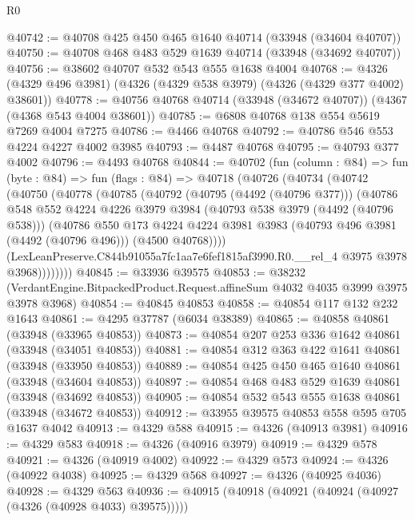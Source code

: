 \begin{lexlean}{R0}
\begin{coremodule}
@40742 := @40708 @425 @450 @465 @1640 @40714 (@33948 (@34604 @40707))
@40750 := @40708 @468 @483 @529 @1639 @40714 (@33948 (@34692 @40707))
@40756 := @38602 @40707 @532 @543 @555 @1638 @4004
@40768 := @4326 (@4329 @496 @3981) (@4326 (@4329 @538 @3979) (@4326 (@4329 @377 @4002) @38601))
@40778 := @40756 @40768 @40714 (@33948 (@34672 @40707)) (@4367 (@4368 @543 @4004 @38601))
@40785 := @6808 @40768 @138 @554 @5619 @7269 @4004 @7275
@40786 := @4466 @40768
@40792 := @40786 @546 @553 @4224 @4227 @4002 @3985
@40793 := @4487 @40768
@40795 := @40793 @377 @4002
@40796 := @4493 @40768
@40844 := @40702
    (fun (column : @84) =>
    fun (byte : @84) =>
    fun (flags : @84) =>
    @40718
      (@40726
        (@40734
          (@40742
            (@40750
              (@40778
                (@40785
                  (@40792
                    (@40795 (@4492 (@40796 @377)))
                    (@40786
                      @548
                      @552
                      @4224
                      @4226
                      @3979
                      @3984
                      (@40793 @538 @3979 (@4492 (@40796 @538)))
                      (@40786
                        @550
                        @173
                        @4224
                        @4224
                        @3981
                        @3983
                        (@40793 @496 @3981 (@4492 (@40796 @496)))
                        (@4500 @40768))))
                  (LexLeanPreserve.C844b91055a7fc1aa7e6fef1815af3990.R0.__rel_4
                    @3975
                    @3978
                    @3968))))))))
@40845 := @33936 @39575
@40853 := @38232
    (VerdantEngine.BitpackedProduct.Request.affineSum @4032 @4035 @3999 @3975 @3978 @3968)
@40854 := @40845 @40853
@40858 := @40854 @117 @132 @232 @1643
@40861 := @4295 @37787 (@6034 @38389)
@40865 := @40858 @40861 (@33948 (@33965 @40853))
@40873 := @40854 @207 @253 @336 @1642 @40861 (@33948 (@34051 @40853))
@40881 := @40854 @312 @363 @422 @1641 @40861 (@33948 (@33950 @40853))
@40889 := @40854 @425 @450 @465 @1640 @40861 (@33948 (@34604 @40853))
@40897 := @40854 @468 @483 @529 @1639 @40861 (@33948 (@34692 @40853))
@40905 := @40854 @532 @543 @555 @1638 @40861 (@33948 (@34672 @40853))
@40912 := @33955 @39575 @40853 @558 @595 @705 @1637 @4042
@40913 := @4329 @588
@40915 := @4326 (@40913 @3981)
@40916 := @4329 @583
@40918 := @4326 (@40916 @3979)
@40919 := @4329 @578
@40921 := @4326 (@40919 @4002)
@40922 := @4329 @573
@40924 := @4326 (@40922 @4038)
@40925 := @4329 @568
@40927 := @4326 (@40925 @4036)
@40928 := @4329 @563
@40936 := @40915 (@40918 (@40921 (@40924 (@40927 (@4326 (@40928 @4033) @39575)))))

\end{coremodule}
\end{lexlean}
